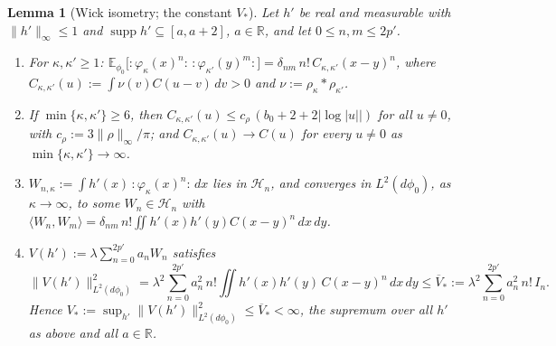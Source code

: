 \documentclass[11pt,a4paper]{article}
\theoremstyle{plain}
\theoremstyle{definition}
\theoremstyle{plain}
\newtheorem{auxlemma}{Lemma}
\theoremstyle{definition}
\newcommand{\R}{\mathbb{R}}
\newcommand{\E}{\mathbb{E}}
\newcommand{\ip}[2]{\langle #1,#2\rangle}
\DeclareMathOperator{\supp}{supp}
\newcommand{\dphi}{d\phi_0}
\begin{document}
\begin{auxlemma}[Wick isometry; the constant $V_*$]\label{aux:notation-wick}
Let $h'$ be real and measurable with $\|h'\|_\infty\le1$ and $\supp h'\subseteq[a,a+2]$,
$a\in\R$, and let $0\le n,m\le2p'$.
\begin{enumerate}
\item[\textup{(i)}] For $\kappa,\kappa'\ge1$:
$\E_{\phi_0}\bigl[{:}\varphi_\kappa(x)^n{:}\,{:}\varphi_{\kappa'}(y)^m{:}\bigr]=\delta_{nm}\,n!\,
C_{\kappa,\kappa'}(x-y)^n$, where $C_{\kappa,\kappa'}(u):=\int\nu(v)C(u-v)\,dv>0$ and
$\nu:=\rho_\kappa*\rho_{\kappa'}$.
\item[\textup{(ii)}] If $\min\{\kappa,\kappa'\}\ge6$, then $C_{\kappa,\kappa'}(u)\le
c_\rho\,(b_0+2+2|\log|u||)$ for all $u\ne0$, with $c_\rho:=3\|\rho\|_\infty/\pi$; and
$C_{\kappa,\kappa'}(u)\to C(u)$ for every $u\ne0$ as $\min\{\kappa,\kappa'\}\to\infty$.
\item[\textup{(iii)}] $W_{n,\kappa}:=\int h'(x)\,{:}\varphi_\kappa(x)^n{:}\,dx$ lies in
$\mathcal H_n$, and converges in $L^2(\dphi)$, as $\kappa\to\infty$, to some $W_n\in\mathcal
H_n$ with $\ip{W_n}{W_m}=\delta_{nm}\,n!\iint h'(x)h'(y)C(x-y)^n\,dx\,dy$.
\item[\textup{(iv)}] $V(h'):=\lambda\sum_{n=0}^{2p'}a_nW_n$ satisfies
\[
 \|V(h')\|^2_{L^2(\dphi)}=\lambda^2\sum_{n=0}^{2p'}a_n^2\,n!\iint h'(x)h'(y)\,C(x-y)^n\,dx\,dy
 \le\overline V_*:=\lambda^2\sum_{n=0}^{2p'}a_n^2\,n!\,I_n .
\]
Hence $V_*:=\sup_{h'}\|V(h')\|^2_{L^2(\dphi)}\le\overline V_*<\infty$, the supremum over all
$h'$ as above and all $a\in\R$.
\end{enumerate}
\end{auxlemma}
\end{document}
